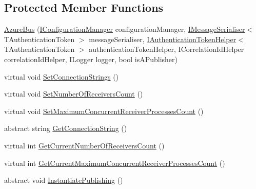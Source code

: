 \subsection*{Protected Member Functions}
\begin{DoxyCompactItemize}
\item 
\hyperlink{classCqrs_1_1Azure_1_1ServiceBus_1_1AzureBus_a1046ff74282fd178f43e28420433d2a9_a1046ff74282fd178f43e28420433d2a9}{Azure\+Bus} (\hyperlink{interfaceCqrs_1_1Configuration_1_1IConfigurationManager}{I\+Configuration\+Manager} configuration\+Manager, \hyperlink{interfaceCqrs_1_1Azure_1_1ServiceBus_1_1IMessageSerialiser}{I\+Message\+Serialiser}$<$ T\+Authentication\+Token $>$ message\+Serialiser, \hyperlink{interfaceCqrs_1_1Authentication_1_1IAuthenticationTokenHelper}{I\+Authentication\+Token\+Helper}$<$ T\+Authentication\+Token $>$ authentication\+Token\+Helper, I\+Correlation\+Id\+Helper correlation\+Id\+Helper, I\+Logger logger, bool is\+A\+Publisher)
\item 
virtual void \hyperlink{classCqrs_1_1Azure_1_1ServiceBus_1_1AzureBus_a8a1be9145b0a92c0037ef1b8b4cc79d9_a8a1be9145b0a92c0037ef1b8b4cc79d9}{Set\+Connection\+Strings} ()
\item 
virtual void \hyperlink{classCqrs_1_1Azure_1_1ServiceBus_1_1AzureBus_a7633f211059ee45dfb907b16a955a790_a7633f211059ee45dfb907b16a955a790}{Set\+Number\+Of\+Receivers\+Count} ()
\item 
virtual void \hyperlink{classCqrs_1_1Azure_1_1ServiceBus_1_1AzureBus_a60cbe46aa3e60528dbd7e07be5132132_a60cbe46aa3e60528dbd7e07be5132132}{Set\+Maximum\+Concurrent\+Receiver\+Processes\+Count} ()
\item 
abstract string \hyperlink{classCqrs_1_1Azure_1_1ServiceBus_1_1AzureBus_a514e371d5ce093678365af31e6c274e3_a514e371d5ce093678365af31e6c274e3}{Get\+Connection\+String} ()
\item 
virtual int \hyperlink{classCqrs_1_1Azure_1_1ServiceBus_1_1AzureBus_a8489f49aa20b972411e12465baa1bd14_a8489f49aa20b972411e12465baa1bd14}{Get\+Current\+Number\+Of\+Receivers\+Count} ()
\item 
virtual int \hyperlink{classCqrs_1_1Azure_1_1ServiceBus_1_1AzureBus_adfed2926ff68eff521e8c64c02cca2a6_adfed2926ff68eff521e8c64c02cca2a6}{Get\+Current\+Maximum\+Concurrent\+Receiver\+Processes\+Count} ()
\item 
abstract void \hyperlink{classCqrs_1_1Azure_1_1ServiceBus_1_1AzureBus_a0bacaa4619921333da4a27371c1d6d0a_a0bacaa4619921333da4a27371c1d6d0a}{Instantiate\+Publishing} ()
\item 

\end{DoxyCompactItemize}
